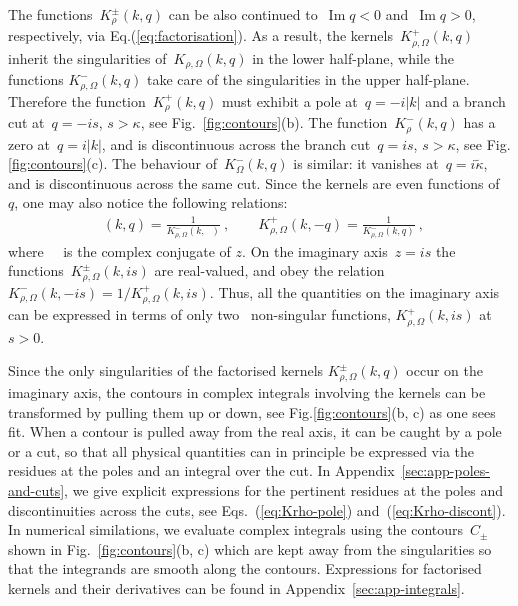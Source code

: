 \documentclass[preprint,aps,eqsecnum, prb]{revtex4-1}
\newcommand{\fplus}[1]{{#1}^{+}}
\newcommand{\fminus}[1]{{#1}^{-}}
\newcommand{\fplusminus}[1]{{#1}^{\pm}}
\newcommand{\widebar}[1]{\mathop{\overline{#1}}}
\renewcommand{\Im}{\mathop{\mathrm{Im}}\nolimits}
\begin{document}
The functions~$\fplusminus{K}_\rho(k, q)$
can be also continued to~$\Im q < 0$ and~$\Im q > 0$, respectively,
via Eq.(\ref{eq:factorisation}). As a result, 
the kernels~$\fplus{K}_{\rho, \Omega}(k, q)$ inherit the singularities
of~$K_{\rho,\Omega}(k, q)$ in the lower half-plane, while the functions
$\fminus{K}_{\rho,\Omega}(k, q)$ take care of the singularities in the upper 
half-plane. 
Therefore the function~$\fplus{K}_\rho(k, q)$ must
exhibit a pole at~$q = -i |k|$ and a branch cut at~$q = -is$, $s > \kappa$, 
see Fig.~\ref{fig:contours}(b). 
The function~$\fminus{K}_\rho(k, q)$ has a zero at~$q = i |k|$,
and is discontinuous across  the branch cut~$q = i s$, $s > \kappa$, 
see Fig.\ref{fig:contours}(c).
The behaviour of~$\fminus{K}_\Omega(k, q)$ is similar:
it vanishes at~$q = i \tilde{\kappa}$,
and is discontinuous across the same cut.
Since the kernels are even functions of~$q$, one may also
notice the following relations:
\begin{align}
{\widebar{\fplus{{K}}_{\rho, \Omega}}}(k, q)
= \frac{1}{\fminus{K}_{\rho, \Omega}(k, \widebar{q})} \ , \qquad
\fplus{K}_{\rho, \Omega}(k, -q)
= \frac{1}{\fminus{K}_{\rho, \Omega}(k, q)} \ ,
\end{align}
where~$\widebar{z}$ is the complex conjugate of
$z$. On the imaginary axis~$z = is$ 
the functions~$\fplusminus{K}_{\rho, \Omega}(k, is)$
are real-valued, and obey 
the relation~$\fminus{K}_{\rho, \Omega}(k, -is) 
= 1/\fplus{K}_{\rho,\Omega}(k, is)$. Thus, all the quantities
on the imaginary axis can be expressed in terms of only two~ 
non-singular functions, $\fplus{K}_{\rho,\Omega}(k, is)$ at~$s > 0$.

Since the only singularities of the factorised kernels
$\fplusminus{K}_{\rho,\Omega}(k, q)$ occur on the imaginary axis, 
the contours in complex integrals involving the kernels can be  transformed 
by pulling them up or down, see  Fig.\ref{fig:contours}(b, c)
as one sees fit. When a contour is pulled away from the real axis, 
it can be caught by a pole or a cut, so that all physical quantities can 
in principle be expressed via the residues at the poles and an integral 
over the cut.  In Appendix~\ref{sec:app-poles-and-cuts}, we give 
explicit expressions for the pertinent residues at the poles and discontinuities
across the cuts, see Eqs.~(\ref{eq:Krho-pole}) and~(\ref{eq:Krho-discont}).
In numerical similations, we evaluate complex integrals using the 
contours~$C_{\pm}$ shown in Fig.~\ref{fig:contours}(b, c) which 
are kept away from the singularities so that the integrands are smooth
along the contours. Expressions for factorised kernels and their derivatives 
can be found in Appendix~\ref{sec:app-integrals}. 
\end{document}
